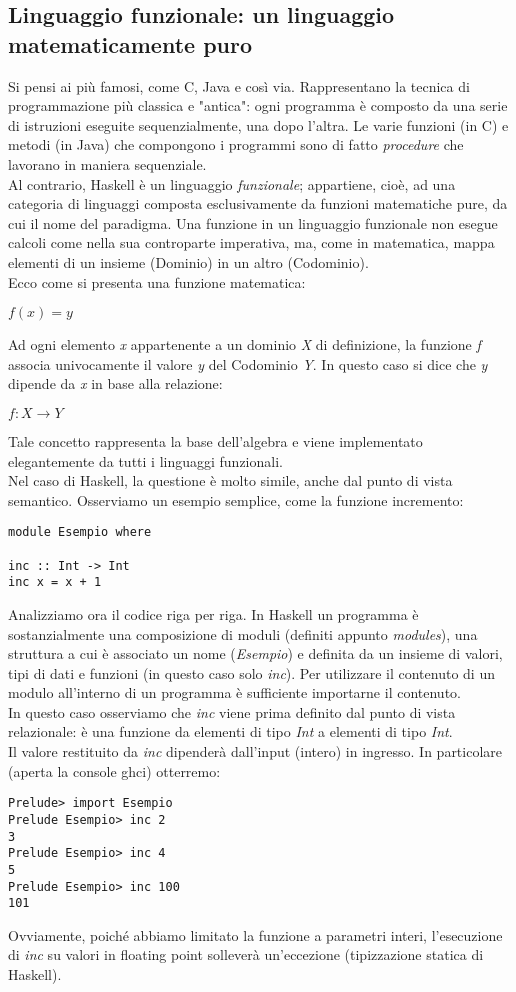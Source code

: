 \subsection{Linguaggio funzionale: un linguaggio matematicamente puro}
Si pensi ai più famosi, come C, Java e così via. Rappresentano la tecnica di programmazione più classica e "antica": ogni programma è composto da una serie di istruzioni eseguite sequenzialmente, una dopo l'altra. Le varie funzioni (in C) e metodi (in Java) che compongono i programmi sono di fatto \textit{procedure} che lavorano in maniera sequenziale.\\
Al contrario, Haskell è un linguaggio \textit{funzionale}; appartiene, cioè, ad una categoria di linguaggi  composta esclusivamente da funzioni matematiche pure, da cui il nome del paradigma. Una funzione in un linguaggio funzionale non esegue calcoli come nella sua controparte imperativa, ma, come in matematica, mappa elementi di un insieme (Dominio) in un altro (Codominio).\\
Ecco come si presenta una funzione matematica:
\begin{center}
$f(x) = y$
\end{center}
Ad ogni elemento \textit{x} appartenente a un dominio \textit{X} di definizione, la funzione \textit{f} associa univocamente il valore \textit{y} del Codominio \textit{Y}. In questo caso si dice che \textit{y} dipende da \textit{x} in base alla relazione:
\begin{center}
$f:X \to Y$
\end{center}
Tale concetto rappresenta la base dell'algebra e viene implementato elegantemente da tutti i linguaggi funzionali.\\
Nel caso di Haskell, la questione è molto simile, anche dal punto di vista semantico. Osserviamo un esempio semplice, come la funzione incremento:
\begin{verbatim}
module Esempio where

inc :: Int -> Int 
inc x = x + 1
\end{verbatim}
Analizziamo ora il codice riga per riga. In Haskell un programma è sostanzialmente una composizione di moduli (definiti appunto \textit{modules}), una struttura a cui è associato un nome (\textit{Esempio}) e definita da un insieme di valori, tipi di dati e funzioni (in questo caso solo \textit{inc}). Per utilizzare il contenuto di un modulo all'interno di un programma è sufficiente importarne il contenuto.\\
In questo caso osserviamo che \textit{inc} viene prima definito dal punto di vista relazionale: è una funzione da elementi di tipo \textit{Int} a elementi di tipo \textit{Int}.\\
Il valore restituito da \textit{inc} dipenderà dall'input (intero) in ingresso. In particolare (aperta la console ghci) otterremo:
\begin{verbatim}
Prelude> import Esempio
Prelude Esempio> inc 2
3
Prelude Esempio> inc 4
5
Prelude Esempio> inc 100
101
\end{verbatim}
Ovviamente, poiché abbiamo limitato la funzione a parametri interi, l'esecuzione di \textit{inc} su valori in floating point solleverà un'eccezione (tipizzazione statica di Haskell).
